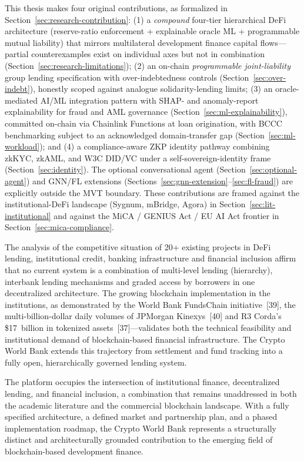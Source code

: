 \documentclass[12pt,a4paper]{report}
\begin{document}
This thesis makes four original contributions, as formalized in Section~\ref{sec:research-contribution}: (1) a \textit{compound} four-tier hierarchical DeFi architecture (reserve-ratio enforcement + explainable oracle ML + programmable mutual liability) that mirrors multilateral development finance capital flows---partial counterexamples exist on individual axes but not in combination (Section~\ref{sec:research-limitations}); (2) an on-chain \textit{programmable joint-liability} group lending specification with over-indebtedness controls (Section~\ref{sec:over-indebt}), honestly scoped against analogue solidarity-lending limits; (3) an oracle-mediated AI/ML integration pattern with SHAP- and anomaly-report explainability for fraud and AML governance (Section~\ref{sec:ml-explainability}), committed on-chain via Chainlink Functions at loan origination, with BCCC benchmarking subject to an acknowledged domain-transfer gap (Section~\ref{sec:ml-workload}); and (4) a compliance-aware ZKP identity pathway combining zkKYC, zkAML, and W3C DID/VC under a self-sovereign-identity frame (Section~\ref{sec:identity}). The optional conversational agent (Section~\ref{sec:optional-agent}) and GNN/FL extensions (Sections~\ref{sec:gnn-extension}--\ref{sec:fl-fraud}) are explicitly outside the MVT boundary. These contributions are framed against the institutional-DeFi landscape (Sygnum, mBridge, Agora) in Section~\ref{sec:lit-institutional} and against the MiCA / GENIUS Act / EU AI Act frontier in Section~\ref{sec:mica-compliance}.

The analysis of the competitive situation of 20+ existing projects in DeFi lending, institutional credit, banking infrastructure and financial inclusion affirm that no current system is a combination of multi-level lending (hierarchy), interbank lending mechanisms and graded access by borrowers in one decentralized architecture. The growing blockchain implementation in the institutions, as demonstrated by the World Bank FundsChain initiative~[39], the multi-billion-dollar daily volumes of JPMorgan Kinexys~[40] and R3 Corda's \$17~billion in tokenized assets~[37]---validates both the technical feasibility and institutional demand of blockchain-based financial infrastructure. The Crypto World Bank extends this trajectory from settlement and fund tracking into a fully open, hierarchically governed lending system.

The platform occupies the intersection of institutional finance, decentralized lending, and financial inclusion, a combination that remains unaddressed in both the academic literature and the commercial blockchain landscape. With a fully specified architecture, a defined market and partnership plan, and a phased implementation roadmap, the Crypto World Bank represents a structurally distinct and architecturally grounded contribution to the emerging field of blockchain-based development finance.
\end{document}
